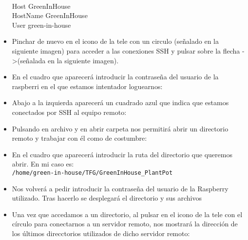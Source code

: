 \begin{itemize}
            \\ Host GreenInHouse
            \\ \hspace*{5mm}HostName GreenInHouse
            \\ \hspace*{5mm}User green-in-house
            \item Pinchar de nuevo en el icono de la tele con un circulo (señalado en la siguiente imagen) para acceder a las conexiones SSH y pulsar sobre la flecha ->(señalada en la siguiente imagen).
            \\ 
            \item En el cuadro que aparecerá introducir la contraseña del usuario de la raspberri en el que estamos intentador loguearnos:
            \\ 
            \item Abajo a la izquierda aparecerá un cuadrado azul que indica que estamos conectados por SSH al equipo remoto:
            \\ 
            \item Pulsando en archivo y en abrir carpeta nos permitirá abrir un directorio remoto y trabajar con él como de costumbre:
            \\ 
            \item En el cuadro que aparecerá introducir la ruta del directorio que queremos abrir. En mi caso es:
            \\ \texttt{/home/green-in-house/TFG/GreenInHouse\_PlantPot}
            \\ 
            \item Nos volverá a pedir introducir la contraseña del usuario de la Raspberry utilizado. Tras hacerlo se desplegará el directorio y sus archivos
            \\ 
            \item Una vez que accedamos a un directorio, al pulsar en el icono de la tele con el círculo para conectarnos a un servidor remoto, nos mostrará la dirección de los últimos direcctorios utilizados de dicho servidor remoto:
            \\ 
        \end{itemize}

